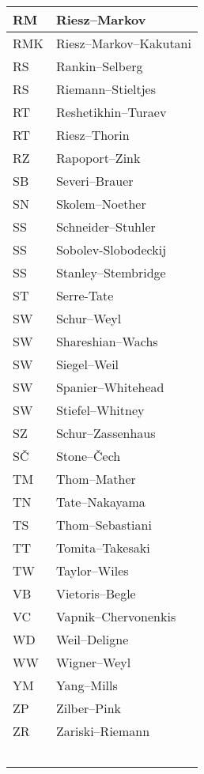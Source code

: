 \documentclass{amsart}
\numberwithin{equation}{section}
\theoremstyle{plain}
\numberwithin{equation}{section}
\theoremstyle{remark}
\begin{document}
\begin{multicols}{2}
{\begin{longtable}{l|l}
RM & Riesz--Markov\\ \hline
RMK & Riesz--Markov--Kakutani\\ \hline
RS & Rankin--Selberg\\ \hline
RS & Riemann--Stieltjes\\ \hline
RT & Reshetikhin--Turaev\\ \hline
RT & Riesz--Thorin\\ \hline
RZ & Rapoport--Zink\\ \hline
SB & Severi--Brauer\\ \hline
SN & Skolem--Noether\\ \hline
SS & Schneider--Stuhler\\ \hline
SS & Sobolev-Slobodeckij\\ \hline
SS & Stanley--Stembridge\\ \hline
ST & Serre-Tate\\ \hline
SW & Schur--Weyl\\ \hline
SW & Shareshian--Wachs\\ \hline
SW & Siegel--Weil\\ \hline
SW & Spanier--Whitehead\\ \hline
SW & Stiefel--Whitney\\ \hline
SZ & Schur--Zassenhaus\\ \hline
SČ & Stone--Čech\\ \hline
TM & Thom--Mather\\ \hline
TN & Tate--Nakayama\\ \hline
TS & Thom--Sebastiani\\ \hline
TT & Tomita--Takesaki\\ \hline
TW & Taylor--Wiles\\ \hline
VB & Vietoris--Begle\\ \hline
VC & Vapnik--Chervonenkis\\ \hline
WD & Weil--Deligne\\ \hline
WW & Wigner--Weyl\\ \hline
YM & Yang--Mills\\ \hline
ZP & Zilber--Pink\\ \hline
ZR & Zariski--Riemann\\ \hline
 & \\ \hline
 & \\ \hline
 & \\ \hline
 & \\ \hline
 & \\ \hline
\end{longtable}
\unskip
\unpenalty
\unpenalty}

\unvbox\ltmcbox




\end{multicols}
\end{document}
